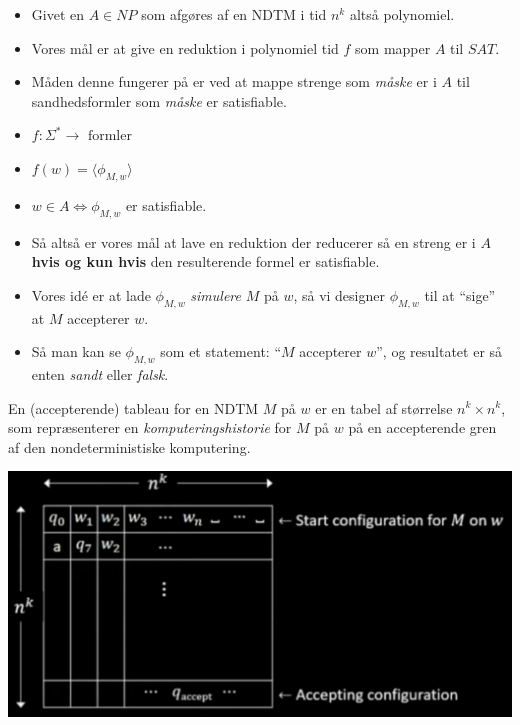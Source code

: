 \begin{frame}[allowframebreaks]
\begin{itemize}
		\item Givet en $A \in NP$ som afgøres af en NDTM i tid $n^{k}$ altså polynomiel.
		\item Vores mål er at give en reduktion i polynomiel tid $f$ som mapper $A$ til $SAT$.
		\item Måden denne fungerer på er ved at mappe strenge som \textit{måske} er i $A$ til sandhedsformler som \textit{måske} er satisfiable.
		\item $f : \Sigma^{*} \longrightarrow \text{ formler }$
		\item $f(w) = \langle \phi_{M,w} \rangle$
		\item $w \in A \iff \phi_{M,w}$ er satisfiable.
		\item Så altså er vores mål at lave en reduktion der reducerer så en streng er i $A$ \textbf{hvis og kun hvis} den resulterende formel er satisfiable.
		\item Vores idé er at lade $\phi_{M,w}$ \textit{simulere} $M$ på $w$, så vi designer \(\phi_{M,w}\) til at ``sige'' at $M$ accepterer $w$.
		\item Så man kan se \(\phi_{M,w}\) som et statement: ``$M$ accepterer $w$'', og resultatet er så enten \textit{sandt} eller \textit{falsk}.
	\end{itemize}

	\begin{definition}
		En (accepterende) tableau for en NDTM $M$ på $w$ er en tabel af størrelse $n^{k} \times n^{k}$, som repræsenterer en \textit{komputeringshistorie} for $M$ på $w$ på en accepterende gren af den nondeterministiske komputering.
	\end{definition}
	\begin{center}
		\includegraphics[scale=0.45]{figur/video16b.png}
	\end{center}


\end{frame}
